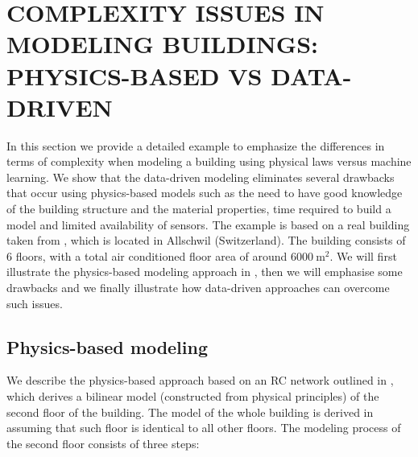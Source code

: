 



\section{COMPLEXITY ISSUES IN MODELING BUILDINGS: PHYSICS-BASED VS DATA-DRIVEN}\label{secModelingIssuesExample}
\textcolor[rgb]{0,0,1}{In this section we provide a detailed example to emphasize the differences in terms of complexity when modeling a building using physical laws versus machine learning. We show that the data-driven modeling eliminates several drawbacks that occur using physics-based models such as the need to have good knowledge of the building structure and the material properties, time required to build a model and limited availability of sensors. The example is based on a real building taken from \cite{Sturzenegger2016}, which is located in Allschwil (Switzerland). The building consists of 6 floors, with a total air conditioned floor area of around $6000\ \mathrm{m^2}$. We will first illustrate the physics-based modeling approach in \cite{Sturzenegger2016}, then we will emphasise some drawbacks and we finally illustrate how data-driven approaches can overcome such issues.
}




\subsection{Physics-based modeling}
\label{SSS:physics-based}

\textcolor[rgb]{0,0,1}{We describe the physics-based approach based on an RC network outlined in \cite{Sturzenegger2016}, which derives a bilinear model (constructed from physical principles) of the second floor of the building. The model of the whole building is derived in \cite{Sturzenegger2016} assuming that such floor is identical to all other floors. The modeling process of the second floor consists of three steps:
}


